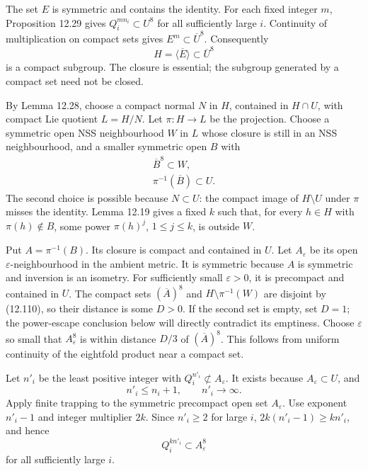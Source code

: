 \documentclass[
  11pt,
]{article}
\begin{document}
The set \(E\) is symmetric and contains the identity. For each fixed
integer \(m\), Proposition 12.29 gives \(Q_i^{mn_i}\subset U^8\) for all
sufficiently large \(i\). Continuity of multiplication on compact sets
gives \(E^m\subset\overline U^8\). Consequently \[
H=\overline{\langle E\rangle}\subset\overline U^8
\tag{12.109}
\] is a compact subgroup. The closure is essential; the subgroup
generated by a compact set need not be closed.

By Lemma 12.28, choose a compact normal \(N\) in \(H\), contained in
\(H\cap U\), with compact Lie quotient \(L=H/N\). Let \(\pi:H\to L\) be
the projection. Choose a symmetric open NSS neighbourhood \(W\) in \(L\)
whose closure is still in an NSS neighbourhood, and a smaller symmetric
open \(B\) with \[
\begin{gathered}
\overline B^8\subset W,\\
\pi^{-1}(\overline B)\subset U.
\end{gathered}
\tag{12.110}
\] The second choice is possible because \(N\subset U\): the compact
image of \(H\setminus U\) under \(\pi\) misses the identity. Lemma 12.19
gives a fixed \(k\) such that, for every \(h\in H\) with
\(\pi(h)\notin B\), some power \(\pi(h)^j\), \(1\leq j\leq k\), is
outside \(W\).

Put \(A=\pi^{-1}(B)\). Its closure is compact and contained in \(U\).
Let \(A_\varepsilon\) be its open \(\varepsilon\)-neighbourhood in the
ambient metric. It is symmetric because \(A\) is symmetric and inversion
is an isometry. For sufficiently small \(\varepsilon>0\), it is
precompact and contained in \(U\). The compact sets \((\overline A)^8\)
and \(H\setminus\pi^{-1}(W)\) are disjoint by (12.110), so their
distance is some \(D>0\). If the second set is empty, set \(D=1\); the
power-escape conclusion below will directly contradict its emptiness.
Choose \(\varepsilon\) so small that \(A_\varepsilon^8\) is within
distance \(D/3\) of \((\overline A)^8\). This follows from uniform
continuity of the eightfold product near a compact set.

Let \(n'_i\) be the least positive integer with
\(Q_i^{n'_i}\not\subset A_\varepsilon\). It exists because
\(A_\varepsilon\subset U\), and \[
n'_i\leq n_i+1,\qquad n'_i\to\infty.
\tag{12.111}
\] Apply finite trapping to the symmetric precompact open set
\(A_\varepsilon\). Use exponent \(n'_i-1\) and integer multiplier
\(2k\). Since \(n'_i\geq2\) for large \(i\), \(2k(n'_i-1)\geq kn'_i\),
and hence \[
Q_i^{kn'_i}\subset A_\varepsilon^8
\tag{12.112}
\] for all sufficiently large \(i\).
\end{document}
